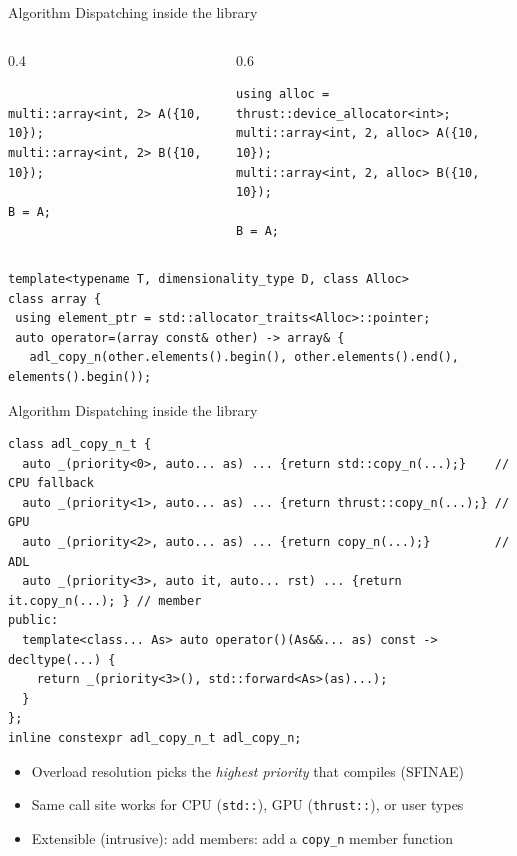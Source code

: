 \begin{frame}[t,fragile]{Algorithm Dispatching inside the library}
\begin{columns}[T]
\begin{column}{0.4\textwidth}
\begin{lstlisting}

multi::array<int, 2> A({10, 10});
multi::array<int, 2> B({10, 10});

B = A;
\end{lstlisting}
\end{column}
\begin{column}{0.6\textwidth}
\begin{lstlisting}
using alloc = thrust::device_allocator<int>;
multi::array<int, 2, alloc> A({10, 10});
multi::array<int, 2, alloc> B({10, 10});

B = A;
\end{lstlisting}
\end{column}
\end{columns}
\begin{lstlisting}
template<typename T, dimensionality_type D, class Alloc>
class array {
 using element_ptr = std::allocator_traits<Alloc>::pointer;
 auto operator=(array const& other) -> array& {
   adl_copy_n(other.elements().begin(), other.elements().end(), elements().begin());
\end{lstlisting}
\begin{center}

\end{center}
\end{frame}

\begin{frame}[fragile]{Algorithm Dispatching inside the library}
\begin{lstlisting}
class adl_copy_n_t {
  auto _(priority<0>, auto... as) ... {return std::copy_n(...);}    // CPU fallback
  auto _(priority<1>, auto... as) ... {return thrust::copy_n(...);} // GPU
  auto _(priority<2>, auto... as) ... {return copy_n(...);}         // ADL
  auto _(priority<3>, auto it, auto... rst) ... {return it.copy_n(...); } // member
public:
  template<class... As> auto operator()(As&&... as) const -> decltype(...) {
    return _(priority<3>(), std::forward<As>(as)...);
  }
};
inline constexpr adl_copy_n_t adl_copy_n;
\end{lstlisting}

\medskip
\begin{itemize}
  \item Overload resolution picks the \emph{highest priority} that compiles (SFINAE)
  \item Same call site works for CPU (\lstinline|std::|), GPU (\lstinline|thrust::|), or user types
  \item Extensible (intrusive): add members: add a \lstinline|copy_n| member function
\end{itemize}

\end{frame}


